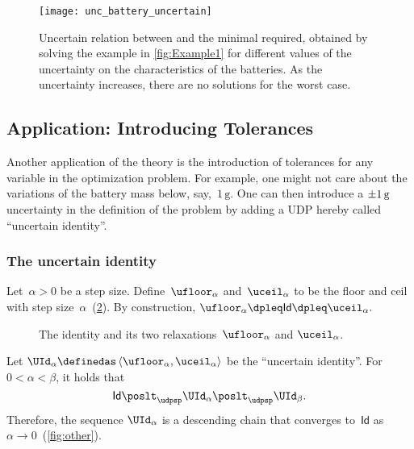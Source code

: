 \begin{figure}[h]
    \begin{centering}
        \texttt{[image: unc\_battery\_uncertain]}
    \end{centering}
    \caption{
        Uncertain relation between  and the minimal  required, obtained by solving the example in \cref{fig:Example1} for different values of the uncertainty on the characteristics of the batteries.
        As the uncertainty increases, there are no solutions for the worst case.
    }
    \label{fig:unc_battery_uncertain}
\end{figure}

\subsection{Application: Introducing Tolerances\label{sec:Application-tolerance}}

Another application of the theory is the introduction of tolerances
for any variable in the optimization problem.
For example, one might
not care about the variations of the battery mass below, say,~$1\,\text{g}$.
One can then introduce a $\pm1\,\text{\ensuremath{\text{g}} }$ uncertainty
in the definition of the problem by adding a UDP hereby called ``uncertain
identity''.

\subsubsection{The uncertain identity}

Let~$\alpha>0$ be a step size.
Define~$\ufloor_{\alpha}$ and~$\uceil_{\alpha}$
to be the floor and ceil with step size~$\alpha$~(\cref{fig:identity_approximation}).
By construction, $\ufloor_{\alpha}\dpleq\mathsf{Id}\dpleq\uceil_{\alpha}.
$

\begin{figure}[h]
    \hfill{}\hfill{}

    \caption{The identity and its two relaxations~$\ufloor_{\alpha}$
        and $\uceil_{\alpha}$.}
    \label{fig:identity_approximation}
\end{figure}

Let $\UId_{\alpha}\definedas\left\langle \ufloor_{\alpha},\uceil_{\alpha}\right\rangle $
be the ``uncertain identity''.
For~$0<\alpha<\beta$, it holds
that
\[
    \mathsf{Id}\poslt_{\udpsp}\UId_{\alpha}\poslt_{\udpsp}\UId_{\beta}.
\]
Therefore, the sequence $\UId_{\alpha}$ is a descending chain that
converges to~$\mathsf{Id}$ as~$\alpha\rightarrow0$~(\cref{fig:other}).

